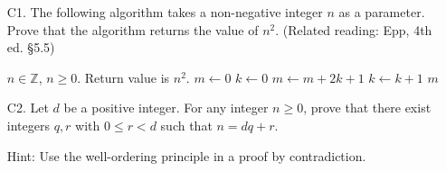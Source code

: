 \documentclass[a4paper,12pt]{article}
\begin{document}
\begin{enumerate}
\item[C1.]
The following algorithm takes a non-negative integer $n$ as a parameter. Prove
that the algorithm returns the value of $n^2$. (Related reading: Epp, 4th ed.
\S 5.5)
\begin{algorithmic}[1]
    \Require $n \in \mathbb{Z}$, $n \geq 0$.
    \Ensure Return value is $n^2$.
    \State $m \gets 0$
    \State $k \gets 0$
        \State $m \gets m + 2k + 1$
        \State $k \gets k + 1$
    \EndWhile
    \State \Return $m$
\EndFunction
\end{algorithmic}
\item[C2.]
Let $d$ be a positive integer. For any integer $n \geq 0$, prove that there
exist integers $q, r$ with $0 \leq r < d$ such that $n = dq+r$.

Hint: Use the well-ordering principle in a proof by contradiction.


\end{enumerate}
\end{document}

